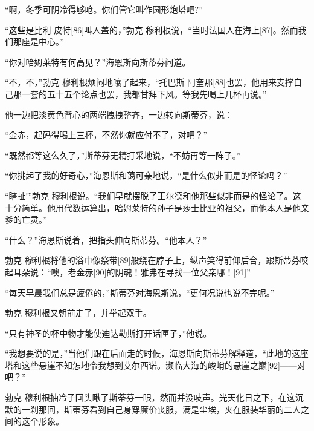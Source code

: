 \documentclass{article}
\begin{document}
“啊，冬季可阴冷得够呛。你们管它叫作圆形炮塔吧?”



“这些是比利 \cdot 皮特[86]叫人盖的，”勃克 \cdot 穆利根说，“当时法国人在海上[87]。然而我们那座是中心。”



“你对哈姆莱特有何高见？”海恩斯向斯蒂芬问道。



“不，不，”勃克 \cdot 穆利根烦闷地嚷了起来，“托巴斯 \cdot 阿奎那[88]也罢，他用来支撑自己那一套的五十五个论点也罢，我都甘拜下风。等我先喝上几杯再说。”



他一边把淡黄色背心的两端拽拽整齐，一边转向斯蒂芬，说：



“金赤，起码得喝上三杯，不然你就应付不了，对吧？”



“既然都等这么久了，”斯蒂芬无精打采地说，“不妨再等一阵子。”



“你挑起了我的好奇心，”海恩斯和蔼可亲地说，“是什么似非而是的怪论吗？”



“瞎扯!”勃克 \cdot 穆利根说。“我们早就摆脱了王尔德和他那些似非而是的怪论了。这十分简单。他用代数运算出，哈姆莱特的孙子是莎士比亚的祖父，而他本人是他亲爹的亡灵。”



“什么？”海恩斯说着，把指头伸向斯蒂芬。“他本人？”



勃克 \cdot 穆利根将他的浴巾像祭带[89]般绕在脖子上，纵声笑得前仰后合，跟斯蒂芬咬起耳朵说：“噢，老金赤[90]的阴魂！雅弗在寻找一位父亲哪！[91]”



“每天早晨我们总是疲倦的，”斯蒂芬对海恩斯说，“更何况说也说不完呢。”



勃克 \cdot 穆利根又朝前走了，并举起双手。



“只有神圣的杯中物才能使迪达勒斯打开话匣子，”他说。



“我想要说的是，”当他们跟在后面走的时候，海恩斯向斯蒂芬解释道，“此地的这座塔和这些悬崖不知怎地令我想到艾尔西诺。濒临大海的峻峭的悬崖之巅[92]——对吧？”



勃克 \cdot 穆利根抽冷子回头瞅了斯蒂芬一眼，然而并没吱声。光天化日之下，在这沉默的一刹那间，斯蒂芬看到自己身穿廉价丧服，满是尘埃，夹在服装华丽的二人之间的这个形象。
\end{document}
